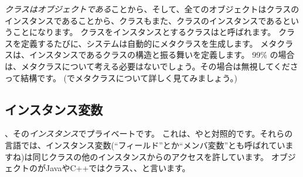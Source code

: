 \documentclass[a4paper,10pt,twoside]{book}
\begin{document}
\emph{クラスはオブジェクトである}ことから、そして、{全てのオブジェクトはクラスのインスタンスである}ことから、クラスもまた、クラスのインスタンスであるということになります。
クラスをインスタンスとするクラスはと呼ばれます。
クラスを定義するたびに、システムは自動的にメタクラスを生成します。
メタクラスは、インスタンスであるクラスの構造と振る舞いを定義します。
99\% の場合は、メタクラスについて考える必要はないでしょう。その場合は無視してくださって結構です。
(でメタクラスについて詳しく見てみましょう。)
\subsection{インスタンス変数}

、その\emph{インスタンス}でプライベートです。
これは、やと対照的です。それらの言語では、インスタンス変数(``フィールド''とか``メンバ変数''とも呼ばれていますね)は同じクラスの他のインスタンスからのアクセスを許しています。
オブジェクトのがJavaやC++ではクラス、、と言います。

\end{document}
